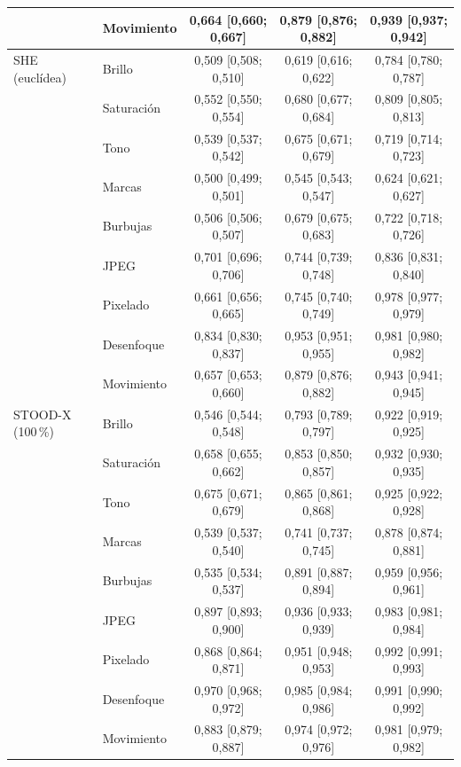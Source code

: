 {\begin{longtable}{llccc}
 & Movimiento & 0{,}664 [0{,}660; 0{,}667] & 0{,}879 [0{,}876; 0{,}882] & 0{,}939 [0{,}937; 0{,}942] \\
\midrule
SHE (euclídea) & Brillo & 0{,}509 [0{,}508; 0{,}510] & 0{,}619 [0{,}616; 0{,}622] & 0{,}784 [0{,}780; 0{,}787] \\
 & Saturación & 0{,}552 [0{,}550; 0{,}554] & 0{,}680 [0{,}677; 0{,}684] & 0{,}809 [0{,}805; 0{,}813] \\
 & Tono & 0{,}539 [0{,}537; 0{,}542] & 0{,}675 [0{,}671; 0{,}679] & 0{,}719 [0{,}714; 0{,}723] \\
 & Marcas & 0{,}500 [0{,}499; 0{,}501] & 0{,}545 [0{,}543; 0{,}547] & 0{,}624 [0{,}621; 0{,}627] \\
 & Burbujas & 0{,}506 [0{,}506; 0{,}507] & 0{,}679 [0{,}675; 0{,}683] & 0{,}722 [0{,}718; 0{,}726] \\
 & JPEG & 0{,}701 [0{,}696; 0{,}706] & 0{,}744 [0{,}739; 0{,}748] & 0{,}836 [0{,}831; 0{,}840] \\
 & Pixelado & 0{,}661 [0{,}656; 0{,}665] & 0{,}745 [0{,}740; 0{,}749] & 0{,}978 [0{,}977; 0{,}979] \\
 & Desenfoque & 0{,}834 [0{,}830; 0{,}837] & 0{,}953 [0{,}951; 0{,}955] & 0{,}981 [0{,}980; 0{,}982] \\
 & Movimiento & 0{,}657 [0{,}653; 0{,}660] & 0{,}879 [0{,}876; 0{,}882] & 0{,}943 [0{,}941; 0{,}945] \\
\midrule
STOOD-X (100\,\%) & Brillo & 0{,}546 [0{,}544; 0{,}548] & 0{,}793 [0{,}789; 0{,}797] & 0{,}922 [0{,}919; 0{,}925] \\
 & Saturación & 0{,}658 [0{,}655; 0{,}662] & 0{,}853 [0{,}850; 0{,}857] & 0{,}932 [0{,}930; 0{,}935] \\
 & Tono & 0{,}675 [0{,}671; 0{,}679] & 0{,}865 [0{,}861; 0{,}868] & 0{,}925 [0{,}922; 0{,}928] \\
 & Marcas & 0{,}539 [0{,}537; 0{,}540] & 0{,}741 [0{,}737; 0{,}745] & 0{,}878 [0{,}874; 0{,}881] \\
 & Burbujas & 0{,}535 [0{,}534; 0{,}537] & 0{,}891 [0{,}887; 0{,}894] & 0{,}959 [0{,}956; 0{,}961] \\
 & JPEG & 0{,}897 [0{,}893; 0{,}900] & 0{,}936 [0{,}933; 0{,}939] & 0{,}983 [0{,}981; 0{,}984] \\
 & Pixelado & 0{,}868 [0{,}864; 0{,}871] & 0{,}951 [0{,}948; 0{,}953] & 0{,}992 [0{,}991; 0{,}993] \\
 & Desenfoque & 0{,}970 [0{,}968; 0{,}972] & 0{,}985 [0{,}984; 0{,}986] & 0{,}991 [0{,}990; 0{,}992] \\
 & Movimiento & 0{,}883 [0{,}879; 0{,}887] & 0{,}974 [0{,}972; 0{,}976] & 0{,}981 [0{,}979; 0{,}982] \\

\end{longtable}}
